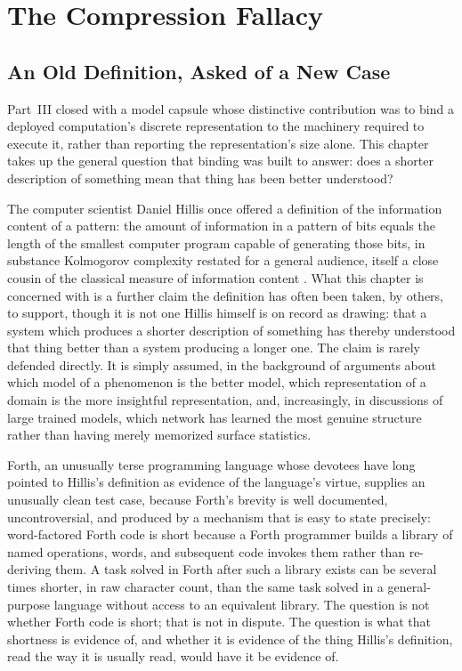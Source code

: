 
\chapter{The Compression Fallacy}
\label{ch:ch15-compression-fallacy}
\section{An Old Definition, Asked of a New Case}

Part~III closed with a model capsule whose distinctive contribution was to bind a deployed computation's discrete representation to the machinery required to execute it, rather than reporting the representation's size alone. This chapter takes up the general question that binding was built to answer: does a shorter description of something mean that thing has been better understood?

The computer scientist Daniel Hillis once offered a definition of the information content of a pattern: the amount of information in a pattern of bits equals the length of the smallest computer program capable of generating those bits, in substance Kolmogorov complexity restated for a general audience, itself a close cousin of the classical measure of information content \cite{shannon1948}. What this chapter is concerned with is a further claim the definition has often been taken, by others, to support, though it is not one Hillis himself is on record as drawing: that a system which produces a shorter description of something has thereby understood that thing better than a system producing a longer one. The claim is rarely defended directly. It is simply assumed, in the background of arguments about which model of a phenomenon is the better model, which representation of a domain is the more insightful representation, and, increasingly, in discussions of large trained models, which network has learned the most genuine structure rather than having merely memorized surface statistics.

Forth, an unusually terse programming language whose devotees have long pointed to Hillis's definition as evidence of the language's virtue, supplies an unusually clean test case, because Forth's brevity is well documented, uncontroversial, and produced by a mechanism that is easy to state precisely: word-factored Forth code is short because a Forth programmer builds a library of named operations, words, and subsequent code invokes them rather than re-deriving them. A task solved in Forth after such a library exists can be several times shorter, in raw character count, than the same task solved in a general-purpose language without access to an equivalent library. The question is not whether Forth code is short; that is not in dispute. The question is what that shortness is evidence of, and whether it is evidence of the thing Hillis's definition, read the way it is usually read, would have it be evidence of.

